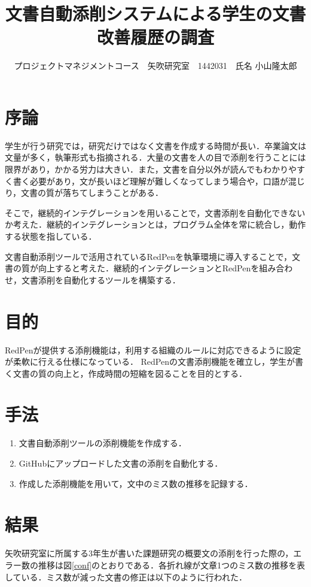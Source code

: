 \documentclass[uplatex,twocolumn,dvipdfmx]{jsarticle}
\title{\vspace{-5mm}\fontsize{14pt}{0pt}\selectfont 文書自動添削システムによる学生の文書改善履歴の調査}
\author{\normalsize プロジェクトマネジメントコース　矢吹研究室　1442031　氏名 小山隆太郎}
\date{}
\begin{document}
\fontsize{10.5pt}{\baselineskip}\selectfont
\maketitle





\section{序論}
学生が行う研究では，研究だけではなく文書を作成する時間が長い．卒業論文は文量が多く，執筆形式も指摘される．大量の文書を人の目で添削を行うことには限界があり，かかる労力は大きい．また，文書を自分以外が読んでもわかりやすく書く必要があり，文が長いほど理解が難しくなってしまう場合や，口語が混じり，文書の質が落ちてしまうことがある．

そこで，継続的インテグレーション\cite{a}を用いることで，文書添削を自動化できないか考えた．継続的インテグレーションとは，プログラム全体を常に統合し，動作する状態を指している．

文書自動添削ツールで活用されているRedPenを執筆環境に導入することで，文書の質が向上すると考えた．継続的インテグレーションとRedPenを組み合わせ，文書添削を自動化するツールを構築する．

\section{目的}
RedPenが提供する添削機能は，利用する組織のルールに対応できるように設定が柔軟に行える仕様になっている．
RedPenの文書添削機能を確立し，学生が書く文書の質の向上と，作成時間の短縮を図ることを目的とする．

\section{手法}
\begin{enumerate}
\item 文書自動添削ツールの添削機能を作成する．
\item GitHubにアップロードした文書の添削を自動化する．
\item 作成した添削機能を用いて，文中のミス数の推移を記録する．
\end{enumerate}

\section{結果}
矢吹研究室に所属する3年生が書いた課題研究の概要文の添削を行った際の，エラー数の推移は図\ref{conf}のとおりである．各折れ線が文章1つのミス数の推移を表している．ミス数が減った文書の修正は以下のように行われた．
\end{document}
